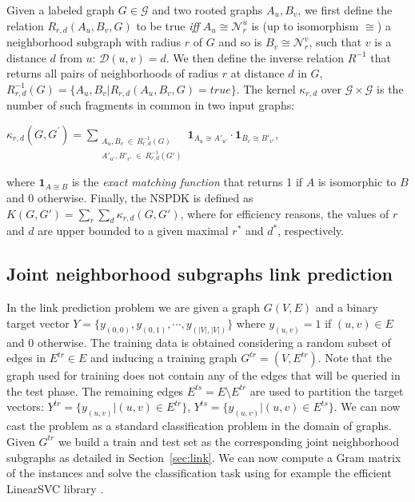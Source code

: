\documentclass[runningheads,a4paper]{llncs}
\begin{document}
Given a labeled graph $G \in \mathcal{G}$ and two rooted graphs $A_u, B_v$, we first define the relation $R_{r,d}(A_u, B_v, G)$ to be true {\em iff} $A_u \cong \mathcal{N}_r^u$ is (up to isomorphism $\cong$) a neighborhood subgraph with radius $r$ of $G$ and so is $B_v \cong  \mathcal{N}_r^v$, such that $v$ is a distance $d$ from $u$: $\mathcal{D}(u,v)= d$. We then define the inverse relation $R^{-1}$ that returns all pairs of neighborhoods of radius $r$ at distance $d$ in $G$, $R^{-1}_{r,d}(G) = \lbrace A_u, B_v | R_{r,d}(A_u,B_v,G)=true\rbrace$. The kernel $\kappa_{r,d}$ over $\mathcal{G} \times \mathcal{G}$ is the number of such fragments in common in two input graphs:
\begin{center}
$\kappa_{r,d}(G,G^{'}) = 
\!\!\!\!\!\!\!\!\!\!\!\! 
\sum\limits_{\substack{A_u, B_v \ \in \ R_{r,d}^{-1}(G) \\ 
{A'}_{u'}, {B'}_{v'} \ \in \ R_{r,d}^{-1}(G')
}} \!\!\!\!\!\!\!\!\!\!\!\!  { { \textbf{1}_{A_{u} \cong A'_{u'}}} \cdot {
\textbf{1}_{B_{v} \cong B'_{v'}}} }$, 
\end{center}
\noindent where $\textbf{1}_{A \cong B}$ is the \textit{exact matching function} that returns 1 if $A$ is isomorphic to $B$ and 0 otherwise. Finally, the NSPDK is defined as $K(G,G') = \sum\limits_{r}{\sum\limits_{d}{\kappa_{r,d}(G,G')}}$, where for efficiency reasons, the values of $r$ and $d$ are upper bounded to a given maximal $r^*$ and $d^*$, respectively.


\subsection{Joint neighborhood subgraphs link prediction}

In the link prediction problem we are given a graph $G(V,E)$ and a binary target vector $Y=\{y_{(0,0)},y_{(0,1)}, \cdots, y_{(|V|,|V|)}\}$ where $y_{(u,v)}=1$ if $(u,v) \in E$ and 0 otherwise. The training data is obtained considering a random subset of edges in $E^{tr} \in E$ and inducing a training graph $G^{tr}=(V,E^{tr})$. Note that the graph used for training does not contain any of the edges that will be queried in the test phase. The remaining edges $E^{ts} = E \setminus E^{tr}$ are used to partition the target vectors: $Y^{tr} = \{y_{(u,v)} | (u,v) \in E^{tr}\}$, $Y^{ts} = \{y_{(u,v)} | (u,v) \in E^{ts}\}$.
We can now cast the problem as a standard classification problem in the domain of graphs. Given $G^{tr}$ we build a train and test set as the corresponding joint neighborhood subgraphs as detailed in Section~\ref{sec:link}. 
We can now compute a Gram matrix of the instances and solve the classification task using for example the efficient LinearSVC library \cite{svm}.
\end{document}
